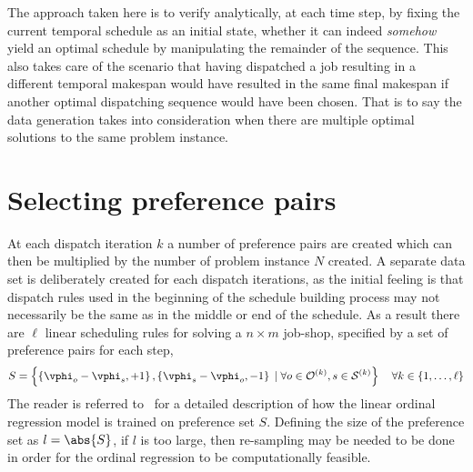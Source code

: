 \documentclass{svjour3}                     %
\begin{document}
The approach taken here is to verify analytically, at each time step, by fixing the current temporal schedule as an initial state, whether it can indeed \emph{somehow} yield an optimal schedule by manipulating the remainder of the sequence. This also takes care of the scenario that having dispatched a job resulting in a different temporal makespan would have resulted in the same final makespan if another optimal dispatching sequence would have been chosen. That is to say the data generation takes into consideration when there are multiple optimal solutions to the same problem instance. 

\section{Selecting preference pairs}\label{sec:S:strategies}
At each dispatch iteration $k$ a number of preference pairs are created which can then be multiplied by the number of problem instance $N$ created. A separate data set is deliberately created for each dispatch iterations, as the initial feeling is that dispatch rules used in the beginning of the schedule building process may not necessarily be the same as in the middle or end of the schedule. As a result there are $\ell$ linear scheduling rules for solving a $n \times m$ job-shop, specified by a set of preference pairs for each step,  
\begin{equation}
S = \left\{\left\{\vphi_o-\vphi_s,+1\right\},\left\{\vphi_s-\vphi_o,-1\right\}
\;|\;\forall o\in \mathcal{O}^{(k)},s\in \mathcal{S}^{(k)}
\right\} \quad \forall k\in\{1,\ldots,\ell\}\label{eq:Sjssp}
\end{equation}
The reader is referred to~\cite{InRu11a} for a detailed description of how the linear ordinal regression model is trained on preference set $S$. Defining the size of the preference set as $l=\abs{S}$, if $l$ is too large, then re-sampling may be needed to be done in order for the ordinal regression to be computationally feasible. 


\end{document}
